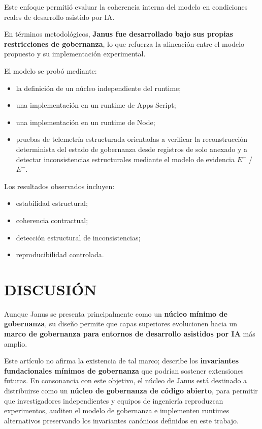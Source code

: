 \documentclass[conference]{IEEEtran}
\begin{document}
Este enfoque permitió evaluar la coherencia interna del modelo en condiciones reales de desarrollo asistido por IA.

En términos metodológicos, \textbf{Janus fue desarrollado bajo sus propias restricciones de gobernanza}, lo que refuerza la alineación entre el modelo propuesto y su implementación experimental.

El modelo se probó mediante:
\begin{itemize}
  \item la definición de un núcleo independiente del runtime;
  \item una implementación en un runtime de Apps Script;
  \item una implementación en un runtime de Node;
  \item pruebas de telemetría estructurada orientadas a verificar la reconstrucción determinista del estado de gobernanza desde registros de solo anexado y a detectar inconsistencias estructurales mediante el modelo de evidencia $E^{+}$ / $E^{-}$.
\end{itemize}

Los resultados observados incluyen:
\begin{itemize}
  \item estabilidad estructural;
  \item coherencia contractual;
  \item detección estructural de inconsistencias;
  \item reproducibilidad controlada.
\end{itemize}

\section{DISCUSIÓN}
Aunque Janus se presenta principalmente como un \textbf{núcleo mínimo de gobernanza}, su diseño permite que capas superiores evolucionen hacia un \textbf{marco de gobernanza para entornos de desarrollo asistidos por IA} más amplio.

Este artículo no afirma la existencia de tal marco; describe los \textbf{invariantes fundacionales mínimos de gobernanza} que podrían sostener extensiones futuras. En consonancia con este objetivo, el núcleo de Janus está destinado a distribuirse como un \textbf{núcleo de gobernanza de código abierto}, para permitir que investigadores independientes y equipos de ingeniería reproduzcan experimentos, auditen el modelo de gobernanza e implementen runtimes alternativos preservando los invariantes canónicos definidos en este trabajo.
\end{document}
